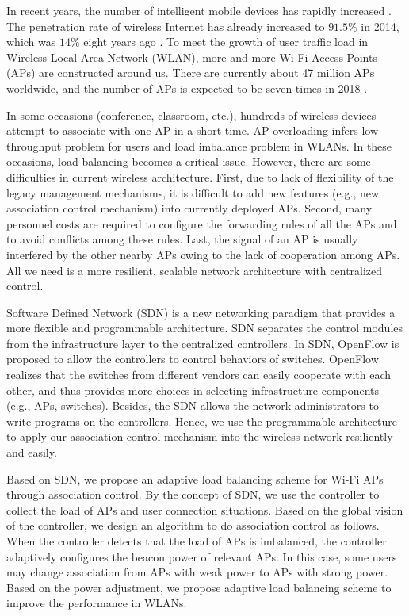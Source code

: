 In recent years, the number of intelligent mobile devices has rapidly increased \cite{tai2015comparative}. The penetration rate of wireless Internet has already increased to $91.5\%$ in 2014, which was $14\%$ eight years ago \cite{survey2014comparative}. To meet the growth of user traffic load in Wireless Local Area Network (WLAN), more and more Wi-Fi Access Points (APs) are constructed around us. There are currently about 47 million APs worldwide, and the number of APs is expected to be seven times in 2018 \cite{iPassSurvey}.

In some occasions (conference, classroom, etc.), hundreds of wireless devices attempt to associate with one AP in a short time. AP overloading infers low throughput problem for users and load imbalance problem in WLANs. 
In these occasions, load balancing becomes a critical issue.
However, there are some difficulties in current wireless architecture. 
First, due to 
lack of flexibility of the legacy management mechanisms, it is difficult to add new features (e.g., new association control mechanism) into currently deployed APs.
Second, many personnel costs are required to configure the forwarding rules of all the APs and to avoid conflicts among these rules.  
Last, the signal of an AP is usually interfered by the other nearby APs owing to the lack of cooperation among APs. 
All we need is a more resilient, scalable network architecture with centralized control.

Software Defined Network (SDN) is a new networking paradigm that provides a more flexible and programmable architecture. SDN separates the control modules from the infrastructure layer to the centralized controllers. 
In SDN, OpenFlow \cite{mckeown2008openflow} is 
proposed to allow
the controllers to control behaviors of switches.
OpenFlow realizes that the switches from different vendors can easily cooperate with each other, and thus provides more choices in selecting infrastructure components (e.g., APs, switches). 
Besides, the SDN allows the network administrators to write programs on the controllers. Hence, we use the programmable architecture to apply our association control mechanism into the wireless network resiliently and easily.

Based on SDN,
we propose an adaptive load balancing scheme for Wi-Fi APs through association control. 
By the concept of SDN, we use the controller to collect the load of APs and user connection situations.
Based on the global vision of the controller, we design an algorithm to do association control as follows. 
When the controller detects that the load of APs is imbalanced, the controller adaptively configures the beacon power of relevant APs. 
In this case, some users may change association from APs with weak power to APs with strong power.
Based on the power adjustment,
we propose adaptive load balancing scheme to improve the performance in WLANs.


